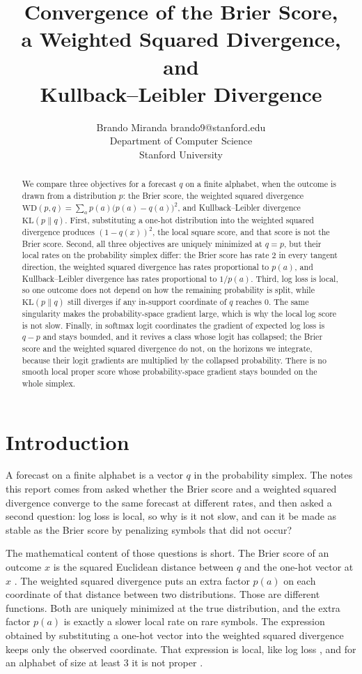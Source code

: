 \documentclass[10pt]{article}
\title{Convergence of the Brier Score,\\ a Weighted Squared Divergence, and\\ Kullback--Leibler Divergence}
\author{\name Brando Miranda \email brando9@stanford.edu \\
  \addr Department of Computer Science\\
  Stanford University}
\newcommand{\WD}{\mathrm{WD}}
\newcommand{\KL}{\mathrm{KL}}
\begin{document}
\maketitle

\begin{abstract}
We compare three objectives for a forecast $q$ on a finite alphabet, when the outcome is drawn from a distribution $p$: the Brier score, the weighted squared divergence $\WD(p,q)=\sum_a p(a)\bigl(p(a)-q(a)\bigr)^2$, and Kullback--Leibler divergence $\KL(p\|q)$.
First, substituting a one-hot distribution into the weighted squared divergence produces $(1-q(x))^2$, the local square score, and that score is not the Brier score.
Second, all three objectives are uniquely minimized at $q=p$, but their local rates on the probability simplex differ: the Brier score has rate $2$ in every tangent direction, the weighted squared divergence has rates proportional to $p(a)$, and Kullback--Leibler divergence has rates proportional to $1/p(a)$.
Third, log loss is local, so one outcome does not depend on how the remaining probability is split, while $\KL(p\|q)$ still diverges if any in-support coordinate of $q$ reaches $0$.
The same singularity makes the probability-space gradient large, which is why the local log score is not slow.
Finally, in softmax logit coordinates the gradient of expected log loss is $q-p$ and stays bounded, and it revives a class whose logit has collapsed; the Brier score and the weighted squared divergence do not, on the horizons we integrate, because their logit gradients are multiplied by the collapsed probability.
There is no smooth local proper score whose probability-space gradient stays bounded on the whole simplex.
\end{abstract}

\section{Introduction}

A forecast on a finite alphabet is a vector $q$ in the probability simplex.
The notes this report comes from asked whether the Brier score and a weighted squared divergence converge to the same forecast at different rates, and then asked a second question: log loss is local, so why is it not slow, and can it be made as stable as the Brier score by penalizing symbols that did not occur?

The mathematical content of those questions is short.
The Brier score of an outcome $x$ is the squared Euclidean distance between $q$ and the one-hot vector at $x$ \citep{brier1950}.
The weighted squared divergence puts an extra factor $p(a)$ on each coordinate of that distance between two distributions.
Those are different functions.
Both are uniquely minimized at the true distribution, and the extra factor $p(a)$ is exactly a slower local rate on rare symbols.
The expression obtained by substituting a one-hot vector into the weighted squared divergence keeps only the observed coordinate.
That expression is local, like log loss \citep{good1952}, and for an alphabet of size at least $3$ it is not proper \citep{bernardo1979,mit67800}.
\end{document}
